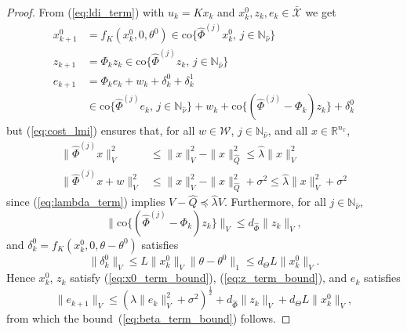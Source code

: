 \documentclass[10pt,a4paper]{amsart}
\begin{document}
\begin{proof}
From (\ref{eq:ldi_term}) with $u_k=Kx_k$ and $x^0_k,z_k,e_k\in \bar{\mathcal{X}}$ we get
\begin{align*}
x^0_{k+1} &= f_K(x^0_k , 0, \theta^0)
\in\mathrm{co}\{\hat{\Phi}^{(j)} x^0_k , \, j \in \mathbb{N}_{\hat{\nu}} \} 
\\
z_{k+1} &= \Phi_k z_k 
\in\mathrm{co}\{\hat{\Phi}^{(j)} z_k , \, j \in \mathbb{N}_{\hat{\nu}} \} 
\\
e_{k+1} &= \Phi_k e_k + w_k + \delta^0_k + \delta^1_k 
\\
&\in\mathrm{co}\{\hat{\Phi}^{(j)} e_k , \, j \in \mathbb{N}_{\hat{\nu}} \} + w_k + \mathrm{co}\{ (\hat{\Phi}^{(j)} \!-\! \Phi_k) z_k \} + \delta^0_k 
\end{align*}
but (\ref{eq:cost_lmi}) ensures that, for all  $w\in\mathcal{W}$,  $j \in \mathbb{N}_{\hat{\nu}}$, and all $x\in\mathbb{R}^{n_x}$,
\begin{align*}
\|\hat{\Phi}^{(j)} x\|_V^2 
&\leq \|x\|_V^2 - \|x\|_{\hat{Q}}^2 \leq \hat{\lambda} \|x\|_V^2
\\
\|\hat{\Phi}^{(j)} x + w\|_V^2 
&\leq \|x\|_V^2 - \|x\|_{\hat{Q}}^2 + \sigma^2 \leq \hat{\lambda} \|x\|_V^2 + \sigma^2
\end{align*}
since (\ref{eq:lambda_term}) implies $V - \hat{Q} \preceq \hat{\lambda} V$. 
Furthermore, for all $j\in\mathbb{N}_{\hat{\nu}}$,
\[
\|\mathrm{co}\{ (\hat{\Phi}^{(j)} - \Phi_k) z_k \}\|_V 
\leq 
d_{\hat{\Phi}} \| z_k\|_V ,
\]
and $\delta^0_k = f_K(x_k^0,0,\theta - \theta^0)$ satisfies
\[
\|\delta^0_k\|_V \leq L \|x_k^0\|_V \|\theta \!-\! \theta^0\|_1
\leq 
d_{\Theta} L \| x^0_k\|_V .
\]
Hence $x^0_k$, $z_k$ satisfy (\ref{eq:x0_term_bound}), (\ref{eq:z_term_bound}), and $e_k$ satisfies  
\[
\|e_{k+1}\|_V \leq 
(\hat{\lambda} \|e_{k}\|_V^2 +\sigma^2)^\frac{1}{2}
+ d_{\hat{\Phi}} \|z_{k}\|_V + 
d_\Theta L \|x_k^0\|_V ,
\]
from which the bound~(\ref{eq:beta_term_bound}) follows.
\end{proof}
\end{document}

